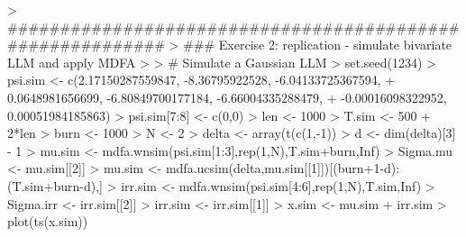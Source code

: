 \documentclass[a4paper]{book}
\begin{document}
% 
\begin{Schunk}
\begin{Sinput}
> ##########################################################
> ### Exercise 2: replication - simulate bivariate LLM and apply MDFA
>  
> # Simulate a Gaussian LLM  
> set.seed(1234)
> psi.sim <- c(2.17150287559847, -8.36795922528, -6.04133725367594, 
+              0.0648981656699, -6.80849700177184, -6.66004335288479, 
+              -0.00016098322952, 0.00051984185863)
> psi.sim[7:8] <- c(0,0)
> len <- 1000
> T.sim <- 500 + 2*len
> burn <- 1000
> N <- 2
> delta <- array(t(c(1,-1)) %
> d <- dim(delta)[3] - 1
> mu.sim <- mdfa.wnsim(psi.sim[1:3],rep(1,N),T.sim+burn,Inf)
> Sigma.mu <- mu.sim[[2]]
> mu.sim <- mdfa.ucsim(delta,mu.sim[[1]])[(burn+1-d):(T.sim+burn-d),]
> irr.sim <- mdfa.wnsim(psi.sim[4:6],rep(1,N),T.sim,Inf)
> Sigma.irr <- irr.sim[[2]]
> irr.sim <- irr.sim[[1]] 
> x.sim <- mu.sim + irr.sim
> plot(ts(x.sim))
\end{Sinput}
\end{Schunk}
\end{document}
